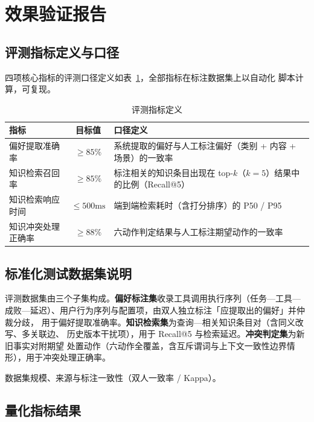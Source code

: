 \section{效果验证报告}\label{sec:evaluation}

\subsection{评测指标定义与口径}\label{sec:metrics}

四项核心指标的评测口径定义如表~\ref{tab:metricdef}，全部指标在标注数据集上以自动化
脚本计算，可复现。

\begin{table}[htbp]
  \centering\small
  \caption{评测指标定义}
  \label{tab:metricdef}
  \begin{tabular}{l c p{7.2cm}}
    \toprule
    指标 & 目标值 & 口径定义 \\
    \midrule
    偏好提取准确率 & $\ge 85\%$ &
      系统提取的偏好与人工标注偏好（类别 + 内容 + 场景）的一致率 \\
    知识检索召回率 & $\ge 85\%$ &
      标注相关的知识条目出现在 top-$k$（$k=5$）结果中的比例（Recall@5） \\
    知识检索响应时间 & $\le 500\mathrm{ms}$ &
      端到端检索耗时（含打分排序）的 P50 / P95 \\
    知识冲突处理正确率 & $\ge 88\%$ &
      六动作判定结果与人工标注期望动作的一致率 \\
    \bottomrule
  \end{tabular}
\end{table}

\subsection{标准化测试数据集说明}\label{sec:dataset}

评测数据集由三个子集构成。\textbf{偏好标注集}收录工具调用执行序列（任务—工具—
成败—延迟）、用户行为序列与配置项，由双人独立标注「应提取出的偏好」并仲裁分歧，
用于偏好提取准确率。\textbf{知识检索集}为查询—相关知识条目对（含同义改写、多关联边、
历史版本干扰项），用于 Recall@5 与检索延迟。\textbf{冲突判定集}为新旧事实对附期望
处置动作（六动作全覆盖，含互斥谓词与上下文一致性边界情形），用于冲突处理正确率。

数据集规模、来源与标注一致性（双人一致率 / Kappa）。

\subsection{量化指标结果}

